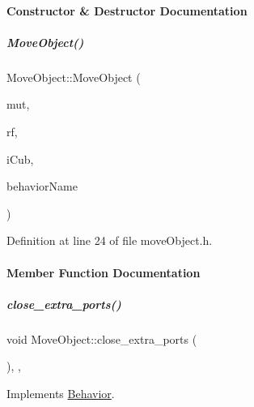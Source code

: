 \paragraph{Constructor \& Destructor Documentation}
\mbox{\label{group__behaviorManager_a3b1bea83b099178491e8f82ec99497b3}} 
\subparagraph{\texorpdfstring{Move\+Object()}{MoveObject()}}
{\footnotesize\ttfamily Move\+Object\+::\+Move\+Object (\begin{DoxyParamCaption}\item[{yarp\+::os\+::\+Mutex $\ast$}]{mut,  }\item[{yarp\+::os\+::\+Resource\+Finder \&}]{rf,  }\item[{\hyperlink{group__icubclient__clients_classicubclient_1_1ICubClient}{icubclient\+::\+I\+Cub\+Client} $\ast$}]{i\+Cub,  }\item[{std\+::string}]{behavior\+Name }\end{DoxyParamCaption})\hspace{0.3cm}{\ttfamily [inline]}}



Definition at line 24 of file move\+Object.\+h.



\paragraph{Member Function Documentation}
\mbox{\label{group__behaviorManager_a98277199c0056a8062184b7c969da0a5}} 
\subparagraph{\texorpdfstring{close\+\_\+extra\+\_\+ports()}{close\_extra\_ports()}}
{\footnotesize\ttfamily void Move\+Object\+::close\+\_\+extra\+\_\+ports (\begin{DoxyParamCaption}{ }\end{DoxyParamCaption})\hspace{0.3cm}{\ttfamily [inline]}, {\ttfamily [protected]}, {\ttfamily [virtual]}}



Implements \hyperlink{group__behaviorManager_affd22d1516cd32ff4f42694a1e6f9ab1}{Behavior}.



